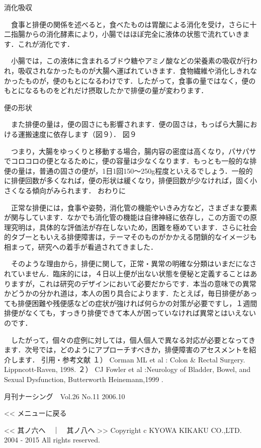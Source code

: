 消化吸収

　食事と排便の関係を述べると，食べたものは胃酸による消化を受け，さらに十二指腸からの消化酵素により，小腸ではほぼ完全に液体の状態で流れていきます．これが消化です．

　小腸では，この液体に含まれるブドウ糖やアミノ酸などの栄養素の吸収が行われ，吸収されなかったものが大腸へ運ばれていきます．食物繊維や消化しきれなかったものが，便のもとになるわけです．したがって，食事の量ではなく，便のもとになるものをどれだけ摂取したかで排便の量が変わります．

便の形状

　また排便の量は，便の固さにも影響されます．便の固さは，もっぱら大腸における運搬速度に依存します（図９）．
図９

　つまり，大腸をゆっくりと移動する場合，腸内容の密度は高くなり，パサパサでコロコロの便となるために，便の容量は少なくなります．もっとも一般的な排便の量は，普通の固さの便が，1日1回150～250g程度といえるでしょう．一般的に排便回数が多くなれば，便の形状は緩くなり，排便回数が少なければ，固く小さくなる傾向がみられます．
おわりに

　正常な排便には，食事や姿勢，消化管の機能やいきみ方など，さまざまな要素が関与しています．なかでも消化管の機能は自律神経に依存し，この方面での原理究明は，具体的な評価法が存在しないため，困難を極めています．さらに社会的タブーともいえる排便障害は，テーマそのものがかかえる閉鎖的なイメージも相まって，研究への着手が看過されてきました．

　そのような理由から，排便に関して，正常・異常の明確な分類はいまだになされていません．臨床的には，４日以上便が出ない状態を便秘と定義することはありますが，これは研究のデザインにおいて必要だからです．本当の意味での異常かどうかの分かれ道は，本人の困り具合によります．たとえば，毎日排便があっても排便困難や残便感などの症状が強ければ何らかの対策が必要ですし，１週間排便がなくても，すっきり排便できて本人が困っていなければ異常とはいえないのです．

　したがって，個々の症例に対しては，個人個人で異なる対応が必要となってきます．次号では，どのようにアプローチすべきか，排便障害のアセスメントを紹介します．
引用・参考文献
１） 	Corman ML et al : Colon & Rectal Surgery. Lippncott-Raven, 1998.
２） 	CJ Fowler et al :Neurology of Bladder, Bowel, and Sexual Dysfunction, Butterworth Heinemann,1999 .

月刊ナーシング　Vol.26 No.11 2006.10

<< メニューに戻る
	

<< 其ノ六へ　｜　其ノ八へ >>
Copyright c KYOWA KIKAKU CO.,LTD. 2004 - 2015 All rights reserved.





